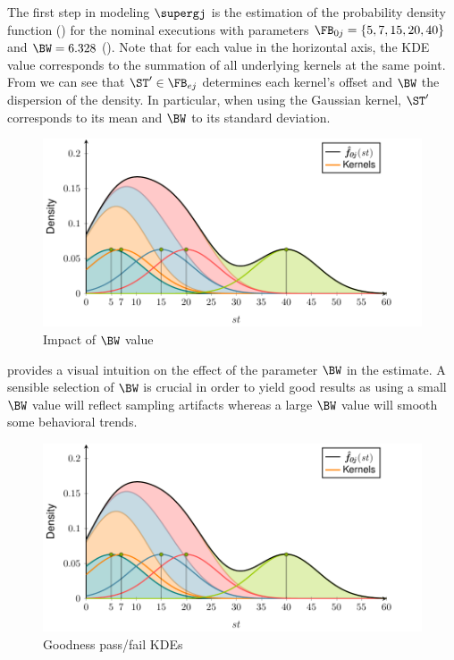 The first step in modeling $\supergj$ is the estimation of the
probability density function () for the nominal
executions with parameters $\FB_{0j}=\{5, 7, 15, 20, 40\}$ and $\BW =
6.328$ ().
%
Note that for each value in the horizontal axis, the \ac{KDE} value
corresponds to the summation of all underlying kernels at the same
point.
%
From  we can see that $\ST^\prime \in \FB_{ej}$
determines each kernel's offset and $\BW$ the dispersion of the
density.
%
In particular, when using the Gaussian kernel, $\ST^\prime$
corresponds to its mean and $\BW$ to its standard deviation.

\begin{figure}[!ht]
  \includegraphics[page=2]{figures/nfge/figures/main}
  \caption{Impact of $\BW$ value}
  \label{fig:nfge:bw}
\end{figure}

 provides a visual intuition on the effect of the
parameter $\BW$ in the estimate.
%
A sensible selection of $\BW$ is crucial in order to yield good results
as using a small $\BW$ value will reflect sampling artifacts whereas a
large $\BW$ value will smooth some behavioral trends.



\begin{figure}[!ht]
  \includegraphics[page=3,width=\columnwidth,clip]{figures/nfge/figures/main}
  \caption{Goodness \vs{} pass/fail \acs{KDE}s}
  \label{fig:nfge:goodness}
\end{figure}


